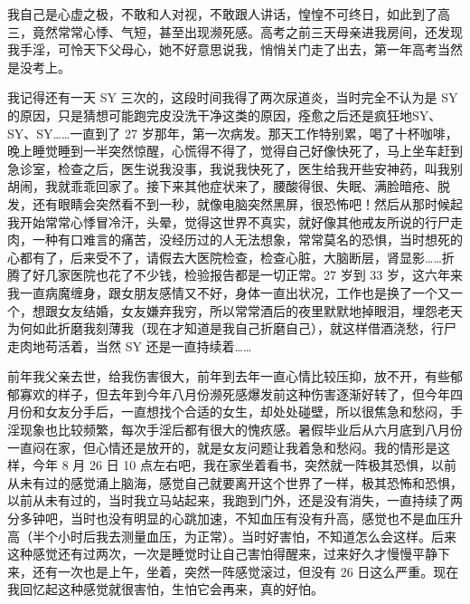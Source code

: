 \begin{case}[濒死感]
    我自己是心虚之极，不敢和人对视，不敢跟人讲话，惶惶不可终日，如此到了高三，竟然常常心悸、气短，甚至出现濒死感。高考之前三天母亲进我房间，还发现我手淫，可怜天下父母心，她不好意思说我，悄悄关门走了出去，第一年高考当然是没考上。
\end{case}

\begin{case}[濒死感]
    我记得还有一天 SY 三次的，这段时间我得了两次尿道炎，当时完全不认为是 SY 的原因，只是猜想可能跑完皮没洗干净这类的原因，痊愈之后还是疯狂地SY、SY、SY……一直到了 27 岁那年，第一次病发。那天工作特别累，喝了十杯咖啡，晚上睡觉睡到一半突然惊醒，心慌得不得了，觉得自己好像快死了，马上坐车赶到急诊室，检查之后，医生说我没事，我说我快死了，医生给我开些安神药，叫我别胡闹，我就乖乖回家了。接下来其他症状来了，腰酸得很、失眠、满脸暗疮、脱发，还有眼睛会突然看不到一秒，就像电脑突然黑屏，很恐怖吧！然后从那时候起我开始常常心悸冒冷汗，头晕，觉得这世界不真实，就好像其他戒友所说的行尸走肉，一种有口难言的痛苦，没经历过的人无法想象，常常莫名的恐惧，当时想死的心都有了，后来受不了，请假去大医院检查，检查心脏，大脑断层，肾显影……折腾了好几家医院也花了不少钱，检验报告都是一切正常。27 岁到 33 岁，这六年来我一直病魔缠身，跟女朋友感情又不好，身体一直出状况，工作也是换了一个又一个，想跟女友结婚，女友嫌弃我穷，所以常常酒后的夜里默默地掉眼泪，埋怨老天为何如此折磨我刻薄我（现在才知道是我自己折磨自己），就这样借酒浇愁，行尸走肉地苟活着，当然 SY 还是一直持续着……
\end{case}

\begin{case}[濒死感]
    前年我父亲去世，给我伤害很大，前年到去年一直心情比较压抑，放不开，有些郁郁寡欢的样子，但去年到今年八月份濒死感爆发前这种伤害逐渐好转了，但今年四月份和女友分手后，一直想找个合适的女生，却处处碰壁，所以很焦急和愁闷，手淫现象也比较频繁，每次手淫后都有很大的愧疚感。暑假毕业后从六月底到八月份一直闷在家，但心情还是放开的，就是女友问题让我着急和愁闷。我的情形是这样，今年 8 月 26 日 10 点左右吧，我在家坐着看书，突然就一阵极其恐惧，以前从未有过的感觉涌上脑海，感觉自己就要离开这个世界了一样，极其恐怖和恐惧，以前从未有过的，当时我立马站起来，我跑到门外，还是没有消失，一直持续了两分多钟吧，当时也没有明显的心跳加速，不知血压有没有升高，感觉也不是血压升高（半个小时后我去测量血压，为正常）。当时好害怕，不知道怎么会这样。后来这种感觉还有过两次，一次是睡觉时让自己害怕得醒来，过来好久才慢慢平静下来，还有一次也是上午，坐着，突然一阵感觉滚过，但没有 26 日这么严重。现在我回忆起这种感觉就很害怕，生怕它会再来，真的好怕。
\end{case}

